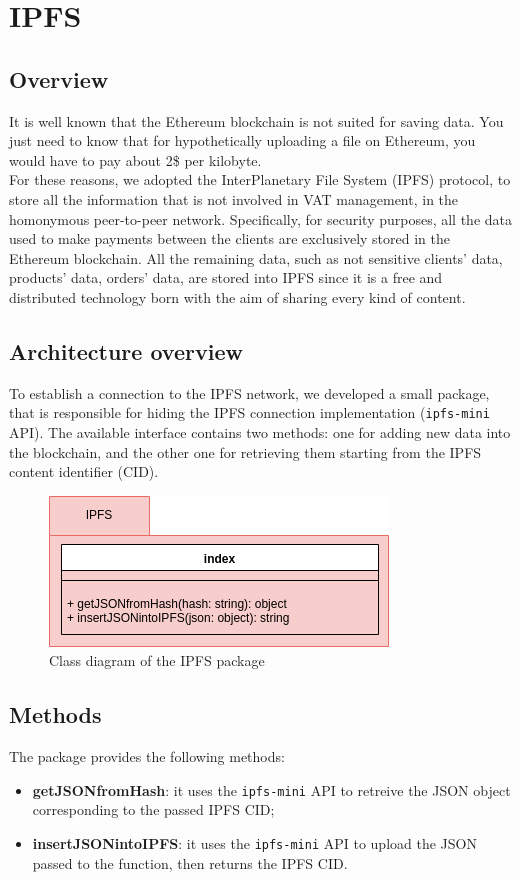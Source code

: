 \section{IPFS} 

\subsection{Overview}
It is well known that the Ethereum blockchain is not suited for saving data. You just need to know that for hypothetically uploading a file on Ethereum, you would have to pay about 2\$ per kilobyte. 
\\
For these reasons, we adopted the InterPlanetary File System (IPFS) protocol, to store all the information that is not involved in VAT management, in the homonymous peer-to-peer network. Specifically, for security purposes, all the data used to make payments between the clients are exclusively stored in the Ethereum blockchain. All the remaining data, such as not sensitive clients' data, products' data, orders' data, are stored into IPFS since it is a free and distributed technology born with the aim of sharing every kind of content.


\subsection{Architecture overview}

To establish a connection to the IPFS network, we developed a small package, that is responsible for hiding the IPFS connection implementation (\texttt{ipfs-mini} API). The available interface contains two methods: one for adding new data into the blockchain, and the other one for retrieving them starting from the IPFS content identifier (CID).
\begin{figure}[h]
	\centering
	\includegraphics[scale=0.6]{res/images/IPFS.png}
	\caption{Class diagram of the IPFS package}
\end{figure}
\subsection{Methods}
The package provides the following methods:
\begin{itemize}
	\item \textbf{getJSONfromHash}: it uses the \texttt{ipfs-mini} API to retreive the JSON object corresponding to the passed IPFS CID;
	\item \textbf{insertJSONintoIPFS}: it uses the \texttt{ipfs-mini} API to upload the JSON passed to the function, then returns the IPFS CID.
\end{itemize}

